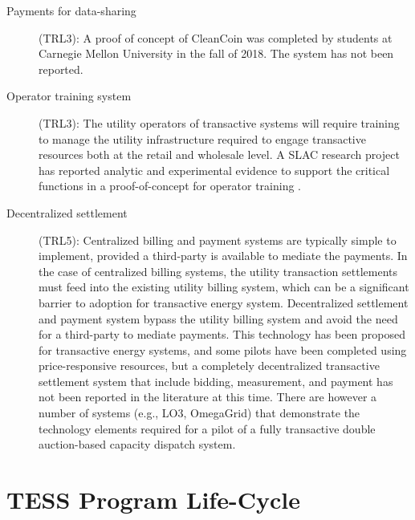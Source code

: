 \documentclass[10pt,twocolumn]{article}
\begin{document}
\begin{description}
    \item[Payments for data-sharing] (TRL3): A proof of concept of CleanCoin was completed by students at Carnegie Mellon University in the fall of 2018. The system has not been reported.

    \item[Operator training system] (TRL3): The utility operators of transactive systems will require training to manage the utility infrastructure required to engage transactive resources both at the retail and wholesale level.  A SLAC research project has reported analytic and experimental evidence to support the critical functions in a proof-of-concept for operator training \cite{hu2019}. 

    \item[Decentralized settlement] (TRL5): Centralized billing and payment systems are typically simple to implement, provided a third-party is available to mediate the payments.  In the case of centralized billing systems, the utility transaction settlements must feed into the existing utility billing system, which can be a significant barrier to adoption for transactive energy system.  Decentralized settlement and payment system bypass the utility billing system and avoid the need for a third-party to mediate payments. This technology has been proposed for transactive energy systems, and some pilots have been completed using price-responsive resources, but a completely decentralized transactive settlement system that include bidding, measurement, and payment has not been reported in the literature at this time. There are however a number of systems (e.g., LO3, OmegaGrid) that demonstrate the technology elements required for a pilot of a fully transactive double auction-based capacity dispatch system.

\end{description}

\section{TESS Program Life-Cycle}
\end{document}
